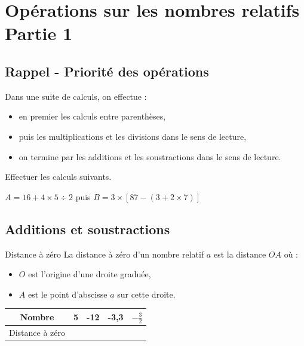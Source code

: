 \documentclass[a4paper]{book}
\begin{document}
\setcounter{chapter}{1}
\newcommand{\monTitre}{Opérations sur les nombres relatifs \\ Partie 1}
\chapter{\monTitre}
\thispagestyle{fancy} 


\section{Rappel - Priorité des opérations}
    \begin{convention}
        Dans une suite de calculs, on effectue :
        \begin{itemize}
            \item en premier les calculs entre parenthèses,
            \item puis les multiplications et les divisions dans le sens de lecture,
            \item on termine par les additions et les soustractions dans le sens de lecture.
        \end{itemize}
    \end{convention}
    
    
    \begin{exemple}
        Effectuer les calculs suivants.
        
        \(A = 16 + 4 \times 5\div2 \) puis 
        \( B = 3\times[87-(3+2\times7)]\)
    \end{exemple}

    
\section{Additions et soustractions}
      
    \begin{definitionTitre}{Distance à zéro}
        La distance à zéro d'un nombre relatif \( a \) est la distance \( OA \) où :
        \begin{itemize}
            \item \( O \) est l'origine d'une droite graduée,
            \item \( A \) est le point d'abscisse \( a \) sur cette droite.
        \end{itemize}
    \end{definitionTitre}
    
    \begin{exemple} 
            \centering
            \begin{tabular}{|c|c|c|c|c|}
                \hline
                Nombre & 5 & -12 & -3,3 & $-\frac{3}{2}$ \\ \hline
                Distance à zéro & & & & \\ \hline
            \end{tabular}
    \end{exemple}
\end{document}
